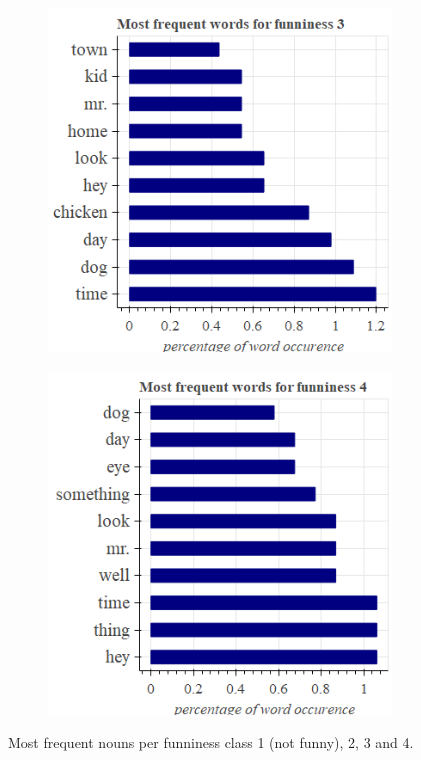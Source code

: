 \documentclass[draft,final,oneside]{vutinfth} %
\begin{document}
\begin{figure}
\begin{subfigure}[b]{0.45\textwidth}
\centering
\includegraphics[width=1.0\textwidth]{graphics/word_occurence/funniness_3}
\end{subfigure}\quad
\begin{subfigure}[b]{0.45\textwidth}
\centering
\includegraphics[width=1.0\textwidth]{graphics/word_occurence/funniness_4}
\end{subfigure}

\caption{Most frequent nouns per funniness class 1 (not funny), 2, 3 and 4.}
\label{fig:wordocc1}

\end{figure}
\end{document}
